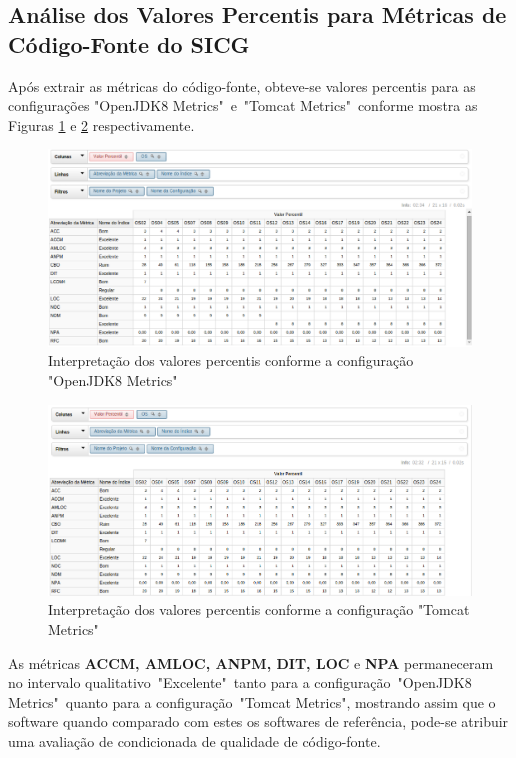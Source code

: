 \subsection{Análise dos Valores Percentis para Métricas de Código-Fonte do SICG}

Após extrair as métricas do código-fonte, obteve-se valores percentis para as configurações "OpenJDK8 Metrics"~e~"Tomcat Metrics"~conforme mostra as Figuras \ref{fig:total-openJDK8} e \ref{fig:total-tomcat}   
respectivamente.

\begin{figure}
\centering
\includegraphics[keepaspectratio=true,scale=0.7]{figuras/total-OpenJDK.eps}
\caption{Interpretação dos valores percentis conforme a configuração "OpenJDK8 Metrics"}
\label{fig:total-openJDK8}
\end{figure}
\FloatBarrier

\begin{figure}
\centering
\includegraphics[keepaspectratio=true,scale=0.7]{figuras/total-tomcat.eps}
\caption{Interpretação dos valores percentis conforme a configuração "Tomcat Metrics"}
\label{fig:total-tomcat}
\end{figure}
\FloatBarrier

As métricas \textbf{ACCM, AMLOC, ANPM, DIT, LOC} e \textbf{NPA} permaneceram no intervalo qualitativo~"Excelente"~tanto para a configuração~"OpenJDK8 Metrics"~quanto para a configuração~"Tomcat Metrics", mostrando assim que o software quando comparado com estes os softwares de referência, pode-se atribuir uma avaliação de condicionada de qualidade de código-fonte.

